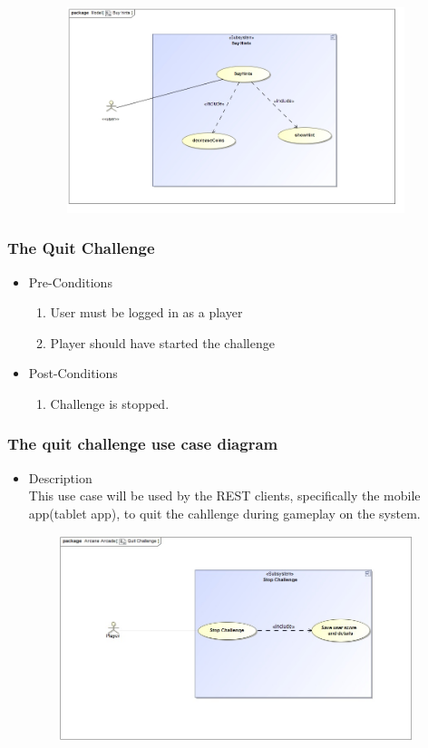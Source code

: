 \documentclass[english]{article}
\begin{document}
	
		\includegraphics[width=14cm,height=6cm,keepaspectratio]{BuyHints.jpg}	
		
			\subsubsection{The Quit Challenge}
		
			\begin{itemize}
	
		
		\item Pre-Conditions
			\begin{enumerate}
				
				\item User must be logged in as a player
				\item Player should have started the challenge
			\end{enumerate}
		\item Post-Conditions
			\begin{enumerate}
			\item Challenge is stopped. 
						
			\end{enumerate}
		

		\end{itemize}
		
		
		\subsubsection* {The quit challenge use case diagram}
		\begin{itemize}
			\item Description\\
			This use case will be used by the REST clients, specifically the mobile app(tablet app), to quit the cahllenge during gameplay on the system.
		\end{itemize}	
		
		
		\includegraphics[width=14cm,height=6cm,keepaspectratio]{quitChallenge.jpg}
		
\end{document}
